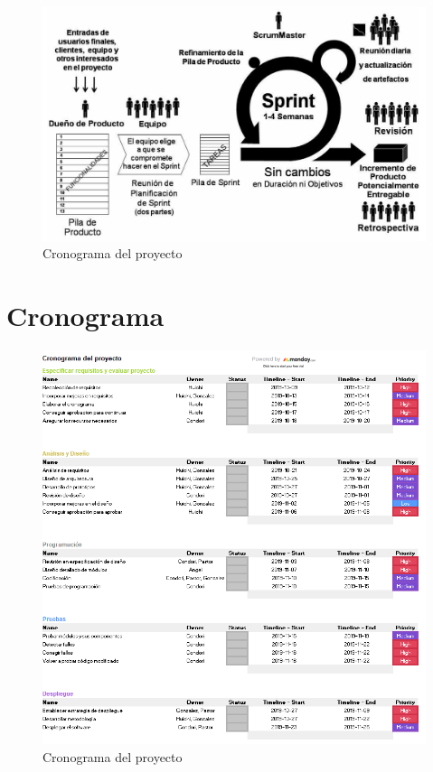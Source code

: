 \documentclass[preprint,12pt]{elsarticle}
\begin{document}
\begin{figure}[htb]
	\begin{center}
		\includegraphics[width=14cm]{./IMAGENES/Scrum} 
		\caption{Cronograma del proyecto}
	\end{center}
\end{figure}




\section{Cronograma}

\begin{figure}[htb]
	\begin{center}
		\includegraphics[width=14cm]{./IMAGENES/Gannt} 
		\caption{Cronograma del proyecto}
	\end{center}
\end{figure}
\end{document}
